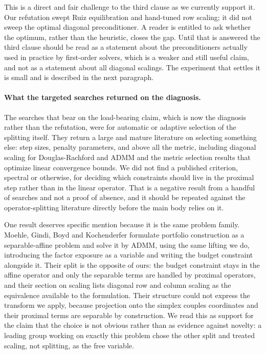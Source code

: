 \documentclass[11pt]{article}
\begin{document}
This is a direct and fair challenge to the third clause as we currently
support it. Our refutation swept Ruiz equilibration and hand-tuned row
scaling; it did not sweep the optimal diagonal preconditioner. A reader is
entitled to ask whether the optimum, rather than the heuristic, closes the
gap. Until that is answered the third clause should be read as a statement
about the preconditioners actually used in practice by first-order solvers,
which is a weaker and still useful claim, and not as a statement about all
diagonal scalings. The experiment that settles it is small and is described
in the next paragraph.

\paragraph{What the targeted searches returned on the diagnosis.}
The searches that bear on the load-bearing claim, which is now the diagnosis
rather than the refutation, were for automatic or adaptive selection of the
splitting itself. They return a large and mature literature on selecting
something else: step sizes, penalty parameters, and above all the metric,
including diagonal scaling for Douglas-Rachford and ADMM and the metric
selection results that optimize linear convergence bounds. We did not find a
published criterion, spectral or otherwise, for deciding which constraints
should live in the proximal step rather than in the linear operator. That is
a negative result from a handful of searches and not a proof of absence, and
it should be repeated against the operator-splitting literature directly
before the main body relies on it.

One result deserves specific mention because it is the same problem family.
Moehle, Gindi, Boyd and Kochenderfer formulate portfolio construction as a
separable-affine problem and solve it by ADMM, using the same lifting we do,
introducing the factor exposure as a variable and writing the budget
constraint alongside it. Their split is the opposite of ours: the budget
constraint stays in the affine operator and only the separable terms are
handled by proximal operators, and their section on scaling lists diagonal
row and column scaling as the equivalence available to the formulation. Their
structure could not express the transform we apply, because projection onto
the simplex couples coordinates and their proximal terms are separable by
construction. We read this as support for the claim that the choice is not
obvious rather than as evidence against novelty: a leading group working on
exactly this problem chose the other split and treated scaling, not
splitting, as the free variable.
\end{document}
